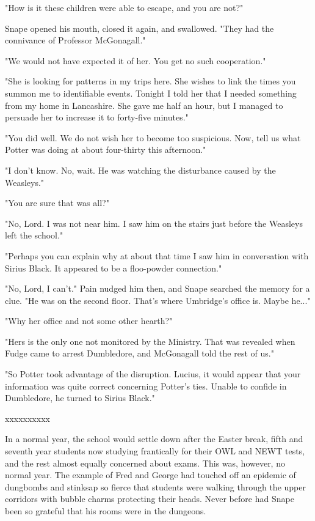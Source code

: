 \documentclass[a4paper,11pt]{article}
\begin{document}
"How is it these children were able to escape, and you are not?"

Snape opened his mouth, closed it again, and swallowed. "They had the connivance of Professor McGonagall."

"We would not have expected it of her. You get no such cooperation."

"She is looking for patterns in my trips here. She wishes to link the times you summon me to identifiable events. Tonight I told her that I needed something from my home in Lancashire. She gave me half an hour, but I managed to persuade her to increase it to forty-five minutes."

"You did well. We do not wish her to become too suspicious. Now, tell us what Potter was doing at about four-thirty this afternoon."

"I don't know. No, wait. He was watching the disturbance caused by the Weasleys."

"You are sure that was all?"

"No, Lord. I was not near him. I saw him on the stairs just before the Weasleys left the school."

"Perhaps you can explain why at about that time I saw him in conversation with Sirius Black. It appeared to be a floo-powder connection."

"No, Lord, I can't." Pain nudged him then, and Snape searched the memory for a clue. "He was on the second floor. That's where Umbridge's office is. Maybe he..."

"Why her office and not some other hearth?"

"Hers is the only one not monitored by the Ministry. That was revealed when Fudge came to arrest Dumbledore, and McGonagall told the rest of us."

"So Potter took advantage of the disruption. Lucius, it would appear that your information was quite correct concerning Potter's ties. Unable to confide in Dumbledore, he turned to Sirius Black."

xxxxxxxxxx

In a normal year, the school would settle down after the Easter break, fifth and seventh year students now studying frantically for their OWL and NEWT tests, and the rest almost equally concerned about exams. This was, however, no normal year. The example of Fred and George had touched off an epidemic of dungbombs and stinksap so fierce that students were walking through the upper corridors with bubble charms protecting their heads. Never before had Snape been so grateful that his rooms were in the dungeons.
\end{document}
